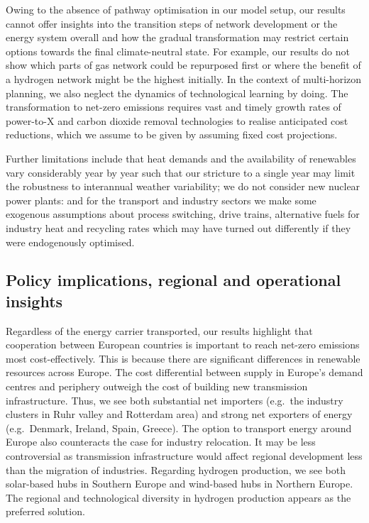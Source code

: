 Owing to the absence of pathway optimisation in our model setup, our results
cannot offer insights into the transition steps of network development or the
energy system overall and how the gradual transformation may restrict certain
options towards the final climate-neutral state. For example, our results do not
show which parts of gas network could be repurposed first or where the benefit
of a hydrogen network might be the highest initially. In the context of
multi-horizon planning, we also neglect the dynamics of technological learning
by
doing.\cite{heubergerPowerCapacity2017,fellingMultiHorizonPlanning2021,zeyenEndogenousLearning2022}
The transformation to net-zero emissions requires vast and timely growth rates
of power-to-X and carbon dioxide removal technologies to realise anticipated
cost reductions, which we assume to be given by assuming fixed cost projections.

Further limitations include that heat demands and the availability of renewables
vary considerably year by year such that our stricture to a single year may
limit the robustness to interannual weather variability; we do not consider new
nuclear power plants: and for the transport and industry sectors we make some
exogenous assumptions about process switching, drive trains, alternative fuels
for industry heat and recycling rates which may have turned out differently if
they were endogenously optimised.


\subsection*{Policy implications, regional and operational insights}
\label{sec:policy}

Regardless of the energy carrier transported, our results highlight that
cooperation between European countries is important to reach net-zero \co
emissions most cost-effectively. This is because there are significant
differences in renewable resources across Europe. The cost differential between
supply in Europe's demand centres and periphery outweigh the cost of building
new transmission infrastructure. Thus, we see both substantial net importers
(e.g.~the industry clusters in Ruhr valley and Rotterdam area) and strong net
exporters of energy (e.g.~Denmark, Ireland, Spain, Greece). The option to
transport energy around Europe also counteracts the case for industry
relocation. It may be less controversial as transmission infrastructure would
affect regional development less than the migration of industries. Regarding
hydrogen production, we see both solar-based hubs in Southern Europe and
wind-based hubs in Northern Europe. The regional and technological diversity in
hydrogen production appears as the preferred solution.


